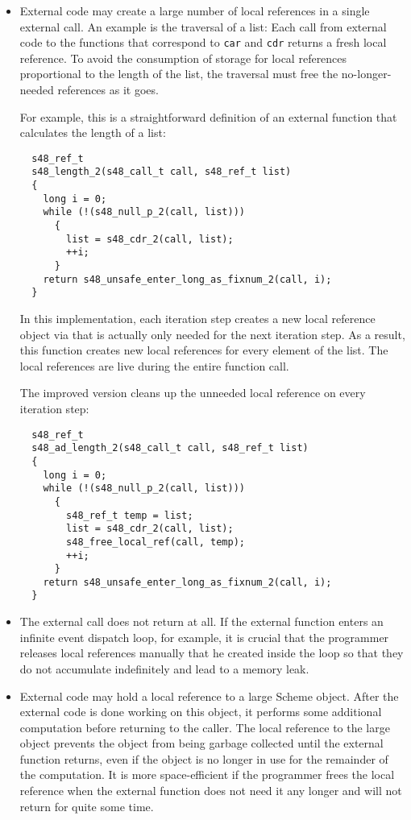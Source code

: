\begin{itemize}
\item External code may create a large number of local references in a
  single external call.  An example is the traversal of a list: Each
  call from external code to the functions that correspond to
  \texttt{car} and \texttt{cdr} returns a fresh local reference.  To
  avoid the consumption of storage for local references proportional
  to the length of the list, the traversal must free the
  no-longer-needed references as it goes.

For example, this is a straightforward definition of an
  external function that calculates the length of a list:

\begin{verbatim}
  s48_ref_t
  s48_length_2(s48_call_t call, s48_ref_t list)
  {
    long i = 0;
    while (!(s48_null_p_2(call, list)))
      {
        list = s48_cdr_2(call, list);
        ++i;
      }
    return s48_unsafe_enter_long_as_fixnum_2(call, i);
  }
\end{verbatim}

  \noindent{}In this implementation, each iteration step creates a new
  local reference object via  that is actually only
  needed for the next iteration step.  As a result, this function
  creates new local references for every element of the list.  The
  local references are live during the entire function call.

  The improved version cleans up the unneeded local reference on every
  iteration step:

\begin{verbatim}
  s48_ref_t
  s48_ad_length_2(s48_call_t call, s48_ref_t list)
  {
    long i = 0;
    while (!(s48_null_p_2(call, list)))
      {
        s48_ref_t temp = list;
        list = s48_cdr_2(call, list);
        s48_free_local_ref(call, temp);
        ++i;
      }
    return s48_unsafe_enter_long_as_fixnum_2(call, i);
  }
\end{verbatim}

\item The external call does not return at all.  If the external
  function enters an infinite event dispatch loop, for example, it is
  crucial that the programmer releases local references manually that
  he created inside the loop so that they do not accumulate
  indefinitely and lead to a memory leak.

\item External code may hold a local reference to a large Scheme
  object.  After the external code is done working on this object, it
  performs some additional computation before returning to the caller.
  The local reference to the large object prevents the object from
  being garbage collected until the external function returns, even if
  the object is no longer in use for the remainder of the computation.
  It is more space-efficient if the programmer frees the local
  reference when the external function does not need it any longer and
  will not return for quite some time.


\end{itemize}
